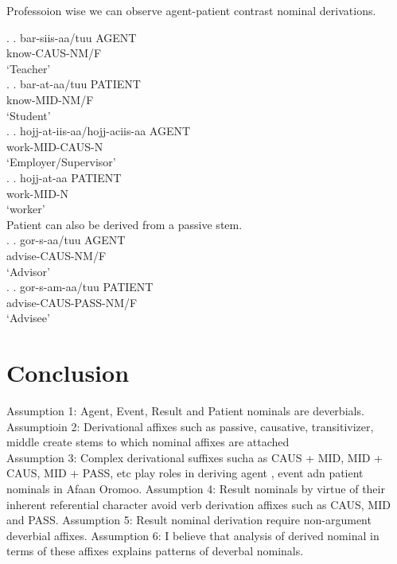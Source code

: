 \documentclass[11pt,a4paper]{article}
\begin{document}
Professoion wise we can observe agent-patient contrast nominal derivations.

\ex.
\ag.
bar-siis-aa/tuu AGENT\\
know-CAUS-NM/F\\
‘Teacher’\\

\ex.
\ag.
bar-at-aa/tuu PATIENT \\
know-MID-NM/F\\
‘Student’\\

\ex.
\ag.
hojj-at-iis-aa/hojj-aciis-aa AGENT \\
work-MID-CAUS-N\\
‘Employer/Supervisor’\\

\ex.
\ag.
hojj-at-aa PATIENT\\
work-MID-N\\
‘worker’\\

Patient can also be derived from a passive stem.\\

\ex.
\ag.
gor-s-aa/tuu AGENT\\
advise-CAUS-NM/F\\
‘Advisor’\\

\ex.
\ag.
gor-s-am-aa/tuu PATIENT\\
advise-CAUS-PASS-NM/F\\
‘Advisee’\\ 



\section{Conclusion}

	Assumption 1: Agent, Event, Result and Patient nominals are deverbials.\\
Assumptioin 2: Derivational affixes such as passive, causative, transitivizer, middle create stems to which nominal affixes are attached\\
Assumption 3: Complex derivational suffixes sucha as CAUS + MID, MID + CAUS, MID + PASS, etc play roles in deriving agent , event adn patient nominals in Afaan Oromoo.
Assumption 4: Result nominals by virtue of their inherent referential character avoid verb derivation affixes such as CAUS, MID and PASS.
Assumption 5: Result nominal derivation require non-argument deverbial affixes. 
Assumption 6: I believe that analysis of derived nominal in terms of these affixes explains patterns of deverbal nominals. \\
\end{document}
